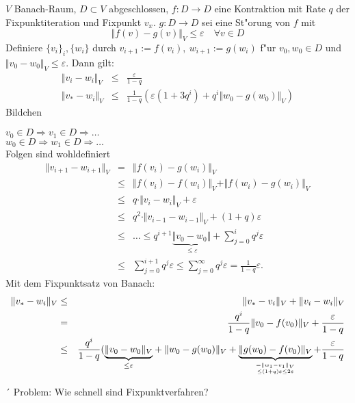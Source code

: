 \documentclass{scrartcl}
\begin{document}
\begin{Satz}
$V$ Banach-Raum, $D \subset V$ abgeschlossen, $f: D \rightarrow D$ eine Kontraktion mit Rate $q$ der Fixpunktiteration und Fixpunkt $v_x$. $g: D \rightarrow D$ sei eine St"orung von $f$ mit
$$ \Vert f(v) - g(v) \Vert_V \leq \varepsilon \quad \forall v \in D$$
Definiere $\{ v_i \}_i, \{ w_i \}$ durch $v_{i+1} := f(v_i), \ w_{i+1} := g(w_i)$ f"ur $v_0, w_0 \in D$ und $\Vert v_0 - w_0 \Vert_V \leq \varepsilon$. Dann gilt:
\begin{eqnarray*}
\Vert v_i - w_i \Vert_V & \leq & \frac{\varepsilon}{1-q} \\
\Vert v_* - w_i \Vert_V & \leq & \frac{1}{1-q} ( \varepsilon (1 + 3 q^i) + q^i \Vert w_0 - g(w_0 ) \Vert_V)
\end{eqnarray*}
Bildchen \\
\end{Satz}
\begin{Bew}
$v_0 \in D \Rightarrow v_1 \in D \Rightarrow \ldots$ \\
$w_0 \in D \Rightarrow w_1 \in D \Rightarrow \ldots$ \\
Folgen sind wohldefiniert
\begin{eqnarray*}
\Vert v_{i+1} - w_{i+1} \Vert_V & = & \Vert f(v_i) - g(w_i) \Vert_V \\
& \leq & \Vert f(v_i) - f(w_i) \Vert_V + \Vert f(w_i) - g(w_i) \Vert_V \\
& \leq & q \cdot \Vert v_i - w_i \Vert_V + \varepsilon \\
& \leq & q^2 \cdot \Vert v_{i-1} - w_{i-1} \Vert_V + (1+q) \varepsilon \\
& \leq & \ldots \leq q^{i+1} \underbrace{\Vert v_0 - w_0 \Vert}_{\leq \varepsilon} + \sum\limits_{j=0}^i q^j \varepsilon \\
& \leq & \sum\limits_{j=0}^{i+1} q^j \varepsilon
\leq \sum\limits_{j=0}^{\infty} q^j \varepsilon = \frac{1}{1-q} \varepsilon.
\end{eqnarray*}
Mit dem Fixpunktsatz von Banach:
\begin{eqnarray*}
\Vert v_* - w_i \Vert_V & \leq & \Vert v_* - v_i \Vert_V + \Vert v_i - w_i \Vert_V \\
& = & \frac{q^i}{1-q} \Vert v_0 - f(v_0) \Vert_V + \frac{\varepsilon}{1-q} \\
& \leq & \frac{q^i}{1-q} ({\underbrace{ \Vert v_0 - w_0 \Vert_V }_{\leq \varepsilon}} + \Vert w_0 - g(w_0) \Vert_V + \underbrace{ \Vert g(w_0) - f(v_0) \Vert_V}_{\genfrac{}{}{0pt}{}{= \Vert w_1 - v_1 \Vert_V}{\leq (1+q) \varepsilon \leq 2 \varepsilon}} + \frac{\varepsilon}{1-q}
\end{eqnarray*}
\end{Bew}´
Problem: Wie schnell sind Fixpunktverfahren?
\end{document}
